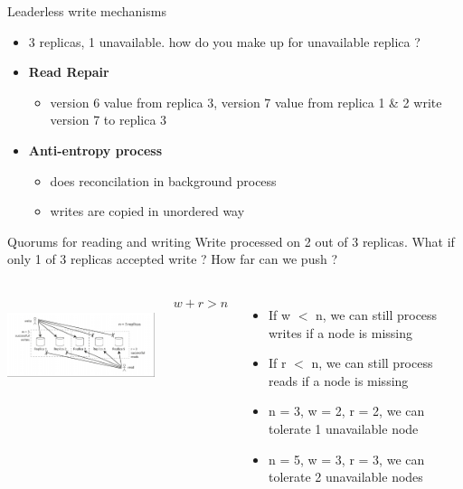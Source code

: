 \documentclass[9pt]{beamer}
\begin{document}
\begin{frame}{Leaderless write mechanisms}
  \begin{itemize}
    \item 3 replicas, 1 unavailable. how do you make up for unavailable replica ?
      \pause
    \item \textbf{Read Repair}
      \begin{itemize}
        \item version 6 value from replica 3, version 7 value from replica 1 \& 2 write version 7 to replica 3
      \end{itemize}
      \pause
    \item \textbf{Anti-entropy process}
      \begin{itemize}
        \item does reconcilation in background process
        \item writes are copied in unordered way
      \end{itemize}
  \end{itemize}
\end{frame}


\begin{frame}{Quorums for reading and writing}
  Write processed on 2 out of 3 replicas. What if only 1 of 3 replicas accepted write ? How far can we push ?
  \begin{columns}
    \includegraphics[width=70mm, height=30mm, scale=0.1]{img/replica/w_r_n.png}

    \pause
    \begin{corollary}
      $ w + r > n $
    \end{corollary}
    \pause
    \begin{itemize}
    \item If w $<$ n, we can still process writes if a node is missing
    \item If r $<$ n, we can still process reads if a node is missing
    \item n = 3, w = 2, r = 2, we can tolerate 1 unavailable node
    \item n = 5, w = 3, r = 3, we can tolerate 2 unavailable nodes
    \end{itemize}
  \end{columns}
\end{frame}
\end{document}
